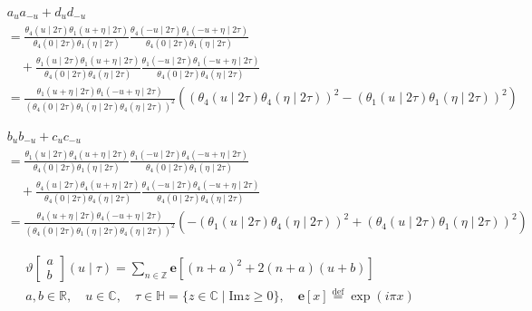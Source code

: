 \documentclass[12pt,b5paper]{ltjsarticle}
\begin{document}
\dotfill

\begin{align}
 & a_{u}a_{-u}+d_{u}d_{-u}\\
  &= 
\frac{\theta_{4}(u\mid 2\tau) \theta_{1}(u+\eta\mid 2\tau)}
 {\theta_{4}(0\mid 2\tau) \theta_{1}(\eta\mid 2\tau)}
\frac{\theta_{4}(-u\mid 2\tau) \theta_{1}(-u+\eta\mid 2\tau)}
 {\theta_{4}(0\mid 2\tau) \theta_{1}(\eta\mid 2\tau)}
 \nonumber \\
 & \quad +
 \frac{\theta_{1}(u\mid 2\tau) \theta_{1}(u+\eta\mid 2\tau)}
 {\theta_{4}(0\mid 2\tau) \theta_{4}(\eta\mid 2\tau)}
 \frac{\theta_{1}(-u\mid 2\tau) \theta_{1}(-u+\eta\mid 2\tau)}
 {\theta_{4}(0\mid 2\tau) \theta_{4}(\eta\mid 2\tau)}
 \\
 &=
 \frac{\theta_{1}(u+\eta\mid 2\tau)\theta_{1}(-u+\eta\mid 2\tau)}{(\theta_{4}(0\mid 2\tau) \theta_{1}(\eta\mid 2\tau) \theta_{4}(\eta\mid 2\tau) )^{2}}
 ( (\theta_{4}(u\mid 2\tau) \theta_{4}(\eta\mid 2\tau) )^{2} - (\theta_{1}(u\mid 2\tau) \theta_{1}(\eta\mid 2\tau))^{2})
\end{align}


\begin{align}
 & b_{u}b_{-u}+c_{u}c_{-u}\\
 &=
  \frac{\theta_{1}(u\mid 2\tau) \theta_{4}(u+\eta\mid 2\tau)}
 {\theta_{4}(0\mid 2\tau) \theta_{1}(\eta\mid 2\tau)}
 \frac{\theta_{1}(-u\mid 2\tau) \theta_{4}(-u+\eta\mid 2\tau)}
 {\theta_{4}(0\mid 2\tau) \theta_{1}(\eta\mid 2\tau)} \nonumber \\
 & \quad +
  \frac{\theta_{4}(u\mid 2\tau) \theta_{4}(u+\eta\mid 2\tau)}
 {\theta_{4}(0\mid 2\tau) \theta_{4}(\eta\mid 2\tau)}
 \frac{\theta_{4}(-u\mid 2\tau) \theta_{4}(-u+\eta\mid 2\tau)}
 {\theta_{4}(0\mid 2\tau) \theta_{4}(\eta\mid 2\tau)}
 \\
 &=
 \frac{\theta_{4}(u+\eta\mid 2\tau)\theta_{4}(-u+\eta\mid 2\tau)}{(\theta_{4}(0\mid 2\tau) \theta_{1}(\eta\mid 2\tau) \theta_{4}(\eta\mid 2\tau) )^{2}}
 ( -(\theta_{1}(u\mid 2\tau) \theta_{4}(\eta\mid 2\tau) )^{2} + (\theta_{4}(u\mid 2\tau) \theta_{1}(\eta\mid 2\tau))^{2})
\end{align}



\dotfill


\begin{gather}
 \vartheta
  \begin{bmatrix}
   a \\ b
  \end{bmatrix}
  (u \mid \tau)
  =
  \sum_{n\in\mathbb{Z}}
  \mathbf{e}
  [(n + a)^{2} + 2(n + a)(u + b)]\\
 a,b\in\mathbb{R},\quad
 u\in\mathbb{C},\quad
 \tau\in\mathbb{H}=\{z\in\mathbb{C} \mid \mathrm{Im}z \geq 0\},\quad
 \mathbf{e}[x] \overset{\mathrm{def}}{=} \exp{(i\pi x)}
\end{gather}
\end{document}
